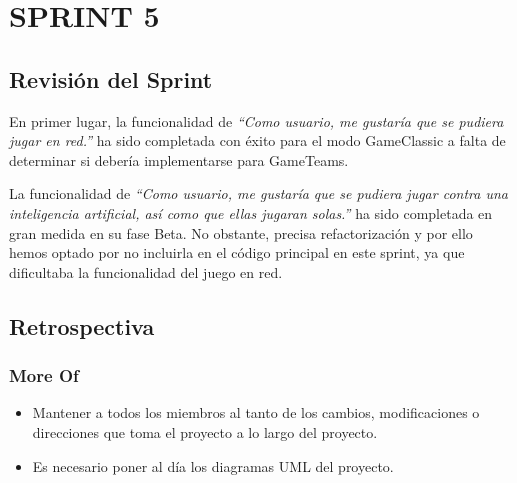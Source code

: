 \documentclass[../../SCRUM.tex]{subfiles}
\begin{document}
\section{SPRINT 5}
\subsection{Revisión del Sprint}
En primer lugar, la funcionalidad de \textit{``Como usuario, me gustaría
que se pudiera jugar en red.''} ha sido completada con éxito para el
modo GameClassic a falta de determinar si debería implementarse para
GameTeams.

La funcionalidad de \textit{``Como usuario, me gustaría que se pudiera
jugar contra una inteligencia artificial, así como que ellas jugaran
solas.''} ha sido completada en gran medida en su fase Beta. No
obstante, precisa refactorización y por ello hemos optado por no
incluirla en el código principal en este sprint, ya que dificultaba la
funcionalidad del juego en red.

\subsection{Retrospectiva}

\subsubsection*{More Of}
\begin{itemize}
\item
  Mantener a todos los miembros al tanto de los cambios, modificaciones
  o direcciones que toma el proyecto a lo largo del proyecto.
\item
  Es necesario poner al día los diagramas UML del proyecto.
\end{itemize}
\end{document}
